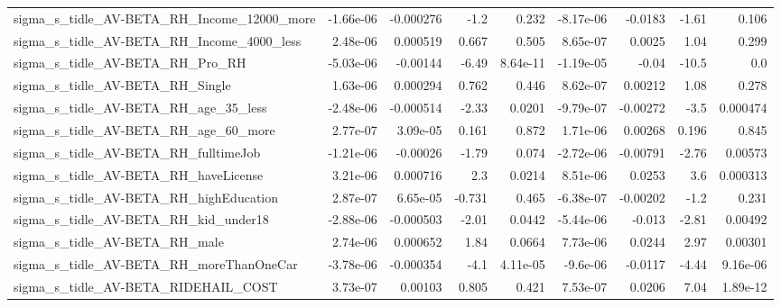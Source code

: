\begin{tabular}{lrrrrrrrr}
sigma\_s\_tidle\_AV-BETA\_RH\_Income\_12000\_more         &   -1.66e-06 &    -0.000276 &      -1.2 &    0.232 &  -8.17e-06 &     -0.0183 &        -1.61 &         0.106 \\
sigma\_s\_tidle\_AV-BETA\_RH\_Income\_4000\_less          &    2.48e-06 &     0.000519 &     0.667 &    0.505 &   8.65e-07 &      0.0025 &         1.04 &         0.299 \\
sigma\_s\_tidle\_AV-BETA\_RH\_Pro\_RH                    &   -5.03e-06 &     -0.00144 &     -6.49 & 8.64e-11 &  -1.19e-05 &       -0.04 &        -10.5 &           0.0 \\
sigma\_s\_tidle\_AV-BETA\_RH\_Single                    &    1.63e-06 &     0.000294 &     0.762 &    0.446 &   8.62e-07 &     0.00212 &         1.08 &         0.278 \\
sigma\_s\_tidle\_AV-BETA\_RH\_age\_35\_less               &   -2.48e-06 &    -0.000514 &     -2.33 &   0.0201 &  -9.79e-07 &    -0.00272 &         -3.5 &      0.000474 \\
sigma\_s\_tidle\_AV-BETA\_RH\_age\_60\_more               &    2.77e-07 &     3.09e-05 &     0.161 &    0.872 &   1.71e-06 &     0.00268 &        0.196 &         0.845 \\
sigma\_s\_tidle\_AV-BETA\_RH\_fulltimeJob               &   -1.21e-06 &     -0.00026 &     -1.79 &    0.074 &  -2.72e-06 &    -0.00791 &        -2.76 &       0.00573 \\
sigma\_s\_tidle\_AV-BETA\_RH\_haveLicense               &    3.21e-06 &     0.000716 &       2.3 &   0.0214 &   8.51e-06 &      0.0253 &          3.6 &      0.000313 \\
sigma\_s\_tidle\_AV-BETA\_RH\_highEducation             &    2.87e-07 &     6.65e-05 &    -0.731 &    0.465 &  -6.38e-07 &    -0.00202 &         -1.2 &         0.231 \\
sigma\_s\_tidle\_AV-BETA\_RH\_kid\_under18               &   -2.88e-06 &    -0.000503 &     -2.01 &   0.0442 &  -5.44e-06 &      -0.013 &        -2.81 &       0.00492 \\
sigma\_s\_tidle\_AV-BETA\_RH\_male                      &    2.74e-06 &     0.000652 &      1.84 &   0.0664 &   7.73e-06 &      0.0244 &         2.97 &       0.00301 \\
sigma\_s\_tidle\_AV-BETA\_RH\_moreThanOneCar            &   -3.78e-06 &    -0.000354 &      -4.1 & 4.11e-05 &   -9.6e-06 &     -0.0117 &        -4.44 &      9.16e-06 \\
sigma\_s\_tidle\_AV-BETA\_RIDEHAIL\_COST                &    3.73e-07 &      0.00103 &     0.805 &    0.421 &   7.53e-07 &      0.0206 &         7.04 &      1.89e-12 \\

\end{tabular}
